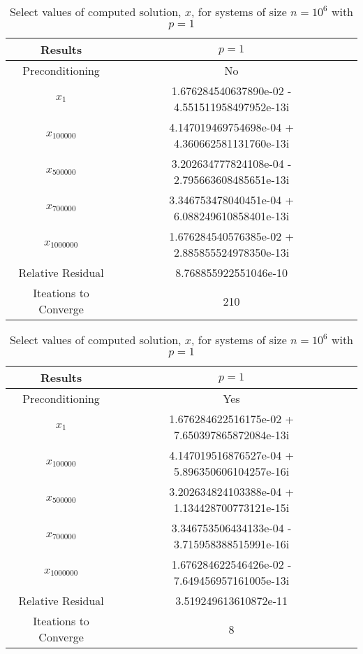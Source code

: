\documentclass[12pt]{article}
\begin{document}
\begin{itemize}
\begin{table}[H]
\centering
\renewcommand{\arraystretch}{1.3}
\begin{small}
\begin{tabular}{| c || c | c |}
\hline
\textbf{Results} &  $p = 1$   \\
\hline 
\hline
Preconditioning & No \\
\hline
$x_1$ &  1.676284540637890e-02 - 4.551511958497952e-13i  \\
$x_{100000}$ &  4.147019469754698e-04 + 4.360662581131760e-13i  \\
$x_{500000}$ &  3.202634777824108e-04 - 2.795663608485651e-13i  \\
$x_{700000}$ &  3.346753478040451e-04 + 6.088249610858401e-13i  \\
$x_{1000000}$ &  1.676284540576385e-02 + 2.885855524978350e-13i  \\
\hline
Relative Residual &  8.768855922551046e-10 \\
\hline
Iteations to Converge & 210 \\
\hline
\end{tabular}
\end{small}
\caption{Select values of computed solution, $x$, for systems of size $n=10^6$ with $p=1$}
\end{table}

\begin{table}[H]
\centering
\renewcommand{\arraystretch}{1.3}
\begin{small}
\begin{tabular}{| c || c | c |}
\hline
\textbf{Results} &  $p = 1$   \\
\hline 
\hline
Preconditioning & Yes \\
\hline
$x_1$ &  1.676284622516175e-02 + 7.650397865872084e-13i  \\
$x_{100000}$ &  4.147019516876527e-04 + 5.896350606104257e-16i  \\
$x_{500000}$ &  3.202634824103388e-04 + 1.134428700773121e-15i  \\
$x_{700000}$ &  3.346753506434133e-04 - 3.715958388515991e-16i  \\
$x_{1000000}$ &   1.676284622546426e-02 - 7.649456957161005e-13i \\
\hline
Relative Residual & 3.519249613610872e-11  \\
\hline
Iteations to Converge & 8 \\
\hline
\end{tabular}
\end{small}
\caption{Select values of computed solution, $x$, for systems of size $n=10^6$ with $p=1$}
\end{table}


\end{itemize}
\end{document}
